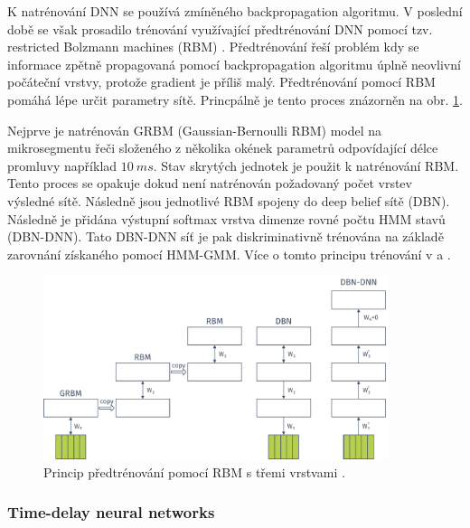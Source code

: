K natrénování DNN se používá zmíněného backpropagation algoritmu. V poslední době se však prosadilo trénování využívající předtrénování DNN pomocí tzv. restricted Bolzmann machines (RBM) \cite{Hinton2012}. Předtrénování řeší problém kdy se informace zpětně propagovaná pomocí backpropagation algoritmu úplně neovlivní počáteční vrstvy, protože gradient je příliš malý. Předtrénování pomocí RBM pomáhá lépe určit parametry sítě. Princpálně je tento proces znázorněn na obr. \ref{fig:asr:acoustic:dnn:pretraining}.

Nejprve je natrénován GRBM (Gaussian-Bernoulli RBM) model na mikrosegmentu řeči složeného z několika okének parametrů odpovídající délce promluvy například $10\ ms$. Stav skrytých jednotek je použit k natrénování RBM. Tento proces se opakuje dokud není natrénován požadovaný počet vrstev výsledné sítě. Následně jsou jednotlivé RBM spojeny do deep belief sítě (DBN). Následně je přidána výstupní softmax vrstva dimenze rovné počtu HMM stavů (DBN-DNN). Tato DBN-DNN síť je pak diskriminativně trénována na základě zarovnání získaného pomocí HMM-GMM. Více o tomto principu trénování v \cite{Hinton2012} a \cite{Vesely2013}.

\begin{figure}[hbpt]
  \centering
  \includegraphics[width=0.9\textwidth]{./ch4-asr/img/pretraining.pdf}
  \caption{Princip předtrénování pomocí RBM s třemi vrstvami \cite{Hinton2012}.}
  \label{fig:asr:acoustic:dnn:pretraining}
\end{figure}

\subsubsection{Time-delay neural networks}
